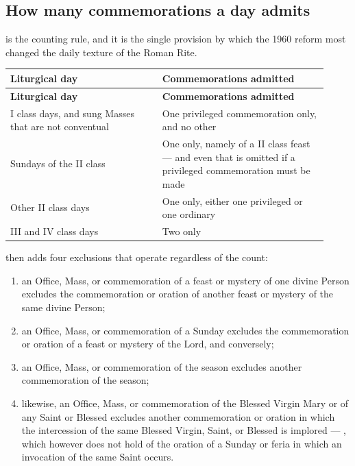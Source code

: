 \subsection{How many commemorations a day admits}

 is the counting rule, and it is the single provision by which the 1960 reform most
changed the daily texture of the Roman Rite.

\begingroup\small
\renewcommand{\arraystretch}{1.15}
\begin{longtable}{@{}>{\raggedright\arraybackslash}p{0.44\linewidth} >{\raggedright\arraybackslash}p{0.48\linewidth}@{}}
\toprule
\textbf{Liturgical day} & \textbf{Commemorations admitted} \\
\midrule
\endfirsthead
\toprule
\textbf{Liturgical day} & \textbf{Commemorations admitted} \\
\midrule
\endhead
\bottomrule
\endfoot
I class days, and sung Masses that are not conventual & One privileged commemoration only, and no other \\
Sundays of the II class & One only, namely of a II class feast — and even that is omitted if a privileged commemoration must be made \\
Other II class days & One only, either one privileged or one ordinary \\
III and IV class days & Two only \\
\end{longtable}
\endgroup


 then adds four exclusions that operate regardless of the count:

\begin{enumerate}[label=(\alph*), leftmargin=1.7em, itemsep=0.25em]
\item an Office, Mass, or commemoration of a feast or mystery of one divine Person excludes the
commemoration or oration of another feast or mystery of the same divine Person;
\item an Office, Mass, or commemoration of a Sunday excludes the commemoration or oration of a
feast or mystery of the Lord, and conversely;
\item an Office, Mass, or commemoration of the season excludes another commemoration of the
season;
\item likewise, an Office, Mass, or commemoration of the Blessed Virgin Mary or of any Saint or
Blessed excludes another commemoration or oration in which the intercession of the same Blessed
Virgin, Saint, or Blessed is implored — , which however does not hold of the oration of a
Sunday or feria in which an invocation of the same Saint occurs.
\end{enumerate}

